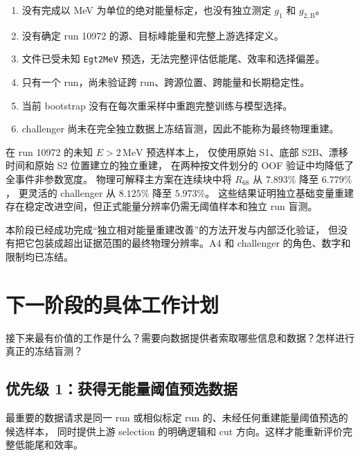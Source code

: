 \documentclass[UTF8,12pt,a4paper,oneside,fontset=none]{ctexart}
\numberwithin{equation}{section}
\newcommand{\Rsixtyeight}{R_{68}}
\begin{document}
\begin{enumerate}[label=\arabic*.]
  \item 没有完成以 MeV 为单位的绝对能量标定，也没有独立测定 \(g_1\) 和 \(g_{2,\mathrm B}\)。
  \item 没有确定 run 10972 的源、目标峰能量和完整上游选择定义。
  \item 文件已受未知 \texttt{Egt2MeV} 预选，无法完整评估低能尾、效率和选择偏差。
  \item 只有一个 run，尚未验证跨 run、跨源位置、跨能量和长期稳定性。
  \item 当前 bootstrap 没有在每次重采样中重跑完整训练与模型选择。
  \item challenger 尚未在完全独立数据上冻结盲测，因此不能称为最终物理重建。
\end{enumerate}

\begin{resultbox}[title={可以直接对导师或合作者使用的结论}]
在 run 10972 的未知 \(E>2\,\mathrm{MeV}\) 预选样本上，
仅使用原始 S1、底部 S2B、漂移时间和原始 S2 位置建立的独立重建，
在两种按文件划分的 OOF 验证中均降低了全事件非参数宽度。
物理可解释主方案在连续块中将 \(\Rsixtyeight\) 从 \(7.893\%\) 降至 \(6.779\%\)，
更灵活的 challenger 从 \(8.125\%\) 降至 \(5.973\%\)。
这些结果证明独立基础变量重建存在稳定改进空间，但正式能量分辨率仍需无阈值样本和独立 run 盲测。
\end{resultbox}

\begin{conclusionbox}
本阶段已经成功完成“独立相对能量重建改善”的方法开发与内部泛化验证，
但没有把它包装成超出证据范围的最终物理分辨率。A4 和 challenger 的角色、数字和限制均已冻结。
\end{conclusionbox}

\section{下一阶段的具体工作计划}

\begin{questionbox}
接下来最有价值的工作是什么？需要向数据提供者索取哪些信息和数据？怎样进行真正的冻结盲测？
\end{questionbox}

\subsection{优先级 1：获得无能量阈值预选数据}

最重要的数据请求是同一 run 或相似标定 run 的、未经任何重建能量阈值预选的候选样本，
同时提供上游 selection 的明确逻辑和 cut 方向。这样才能重新评价完整低能尾和效率。
\end{document}
